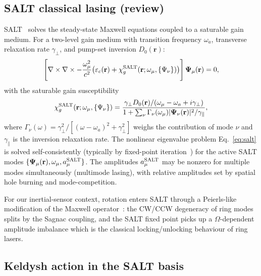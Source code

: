 \documentclass[11pt]{article}
\begin{document}
\subsection{SALT classical lasing (review)}
\label{sec:salt_review}

SALT~\cite{TureciStone2006} solves the steady-state Maxwell equations
coupled to a saturable gain medium.  For a two-level gain medium with
transition frequency $\omega_a$, transverse relaxation rate
$\gamma_\perp$, and pump-set inversion $D_0(\mathbf{r})$:
\begin{equation}
  \left[\nabla\times\nabla\times - \frac{\omega_\mu^2}{c^2}\bigl(
    \varepsilon_c(\mathbf{r})
    + \chi_g^{\rm SALT}(\mathbf{r}; \omega_\mu, \{\Psi_\nu\})\bigr)\right]
  \mathbf{\Psi}_\mu(\mathbf{r}) = 0,
  \label{eq:salt}
\end{equation}
with the saturable gain susceptibility
\begin{equation}
  \chi_g^{\rm SALT}(\mathbf{r}; \omega_\mu, \{\Psi_\nu\})
  = \frac{\gamma_\perp D_0(\mathbf{r})/(\omega_\mu - \omega_a + i\gamma_\perp)}
         {1 + \sum_\nu \Gamma_\nu(\omega_\mu) |\mathbf{\Psi}_\nu(\mathbf{r})|^2
          / \gamma_\|},
  \label{eq:salt_chi}
\end{equation}
where $\Gamma_\nu(\omega) = \gamma_\perp^2/[(\omega - \omega_a)^2
+ \gamma_\perp^2]$ weighs the contribution of mode $\nu$ and
$\gamma_\|$ is the inversion relaxation rate.  The nonlinear eigenvalue
problem Eq.~\eqref{eq:salt} is solved self-consistently (typically by
fixed-point iteration~\cite{EsterhazyLiertzerCerjan2014}) for the
active SALT modes $\{\mathbf{\Psi}_\mu(\mathbf{r}),\omega_\mu,
a_\mu^{\rm SALT}\}$.  The amplitudes $a_\mu^{\rm SALT}$ may be nonzero
for multiple modes simultaneously (multimode lasing), with relative
amplitudes set by spatial hole burning and mode-competition.

For our inertial-sensor context, rotation enters SALT through a
Peierls-like modification of the Maxwell operator~\cite{Post1967}: the
CW/CCW degeneracy of ring modes splits by the Sagnac coupling, and the
SALT fixed point picks up a $\Omega$-dependent amplitude imbalance
which is the classical locking/unlocking behaviour of ring lasers.

\subsection{Keldysh action in the SALT basis}
\label{sec:salt_keldysh_action}
\end{document}

